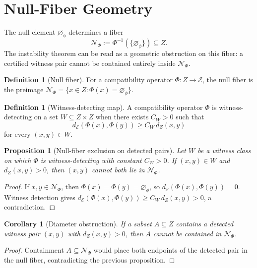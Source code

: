 \documentclass[11pt,a4paper]{article}
\theoremstyle{plain}
\newtheorem{proposition}[theorem]{Proposition}
\newtheorem{corollary}[theorem]{Corollary}
\theoremstyle{definition}
\newtheorem{definition}[theorem]{Definition}
\theoremstyle{remark}
\newcommand{\E}{\mathcal{E}}
\newcommand{\dE}{d_{\mathcal{E}}}
\newcommand{\nullphi}{\varnothing_\phi}
\begin{document}
\section{Null-Fiber Geometry}

The null element $\nullphi$ determines a fiber
\[
\mathcal{N}_\Phi:=\Phi^{-1}(\{\nullphi\})\subseteq Z.
\]
The instability theorem can be read as a geometric obstruction on this fiber: a certified witness pair cannot be contained entirely inside $\mathcal{N}_\Phi$.

\begin{definition}[Null fiber]
For a compatibility operator $\Phi:Z\to\E$, the null fiber is the preimage $\mathcal{N}_\Phi=\{x\in Z:\Phi(x)=\nullphi\}$.
\end{definition}

\begin{definition}[Witness-detecting map]
A compatibility operator $\Phi$ is witness-detecting on a set $W\subseteq Z\times Z$ when there exists $C_W>0$ such that
\[
\dE(\Phi(x),\Phi(y))\geq C_W\,d_Z(x,y)
\]
for every $(x,y)\in W$.
\end{definition}

\begin{proposition}[Null-fiber exclusion on detected pairs]
Let $W$ be a witness class on which $\Phi$ is witness-detecting with constant $C_W>0$. If $(x,y)\in W$ and $d_Z(x,y)>0$, then $(x,y)$ cannot both lie in $\mathcal{N}_\Phi$.
\end{proposition}

\begin{proof}
If $x,y\in\mathcal{N}_\Phi$, then $\Phi(x)=\Phi(y)=\nullphi$, so $\dE(\Phi(x),\Phi(y))=0$. Witness detection gives $\dE(\Phi(x),\Phi(y))\geq C_W\,d_Z(x,y)>0$, a contradiction.
\end{proof}

\begin{corollary}[Diameter obstruction]
If a subset $A\subseteq Z$ contains a detected witness pair $(x,y)$ with $d_Z(x,y)>0$, then $A$ cannot be contained in $\mathcal{N}_\Phi$.
\end{corollary}

\begin{proof}
Containment $A\subseteq\mathcal{N}_\Phi$ would place both endpoints of the detected pair in the null fiber, contradicting the previous proposition.
\end{proof}
\end{document}
